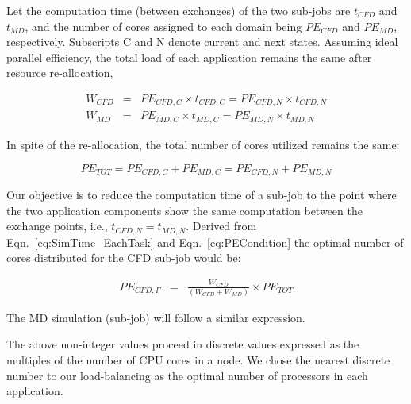 \documentclass[preprint,12pt]{elsarticle}
\begin{document}
Let the computation time (between exchanges) of the two sub-jobs are $t_{CFD}$ and $t_{MD}$, and the number of cores assigned to each domain being $PE_{CFD}$ and $PE_{MD}$, respectively. Subscripts C and N denote current and next states. Assuming ideal parallel efficiency, the total load of each application remains the same after resource re-allocation,

\vspace{-.2em}
\footnotesize
\begin{eqnarray}
W_{CFD}&=&PE_{CFD,C}\times t_{CFD,C}=PE_{CFD,N}\times t_{CFD,N} \nonumber \\
W_{MD}&=&PE_{MD,C}\times t_{MD,C}=PE_{MD,N}\times t_{MD,N}
\label{eq:SimTime_EachTask}
\end{eqnarray}
\normalsize

In spite of the re-allocation, the total number of cores utilized remains the same:

\vspace{-.2em}
\footnotesize
\begin{equation}
PE_{TOT}=PE_{CFD,C}+PE_{MD,C}=PE_{CFD,N}+PE_{MD,N}
\label{eq:PECondition}
\end{equation}
\normalsize

Our objective is to reduce the computation time of a sub-job to the point where the two application components show the same computation between the exchange points, i.e., $t_{CFD,N} = t_{MD,N}$. Derived from Eqn.~\ref{eq:SimTime_EachTask} and Eqn.~\ref{eq:PECondition} the optimal number of cores distributed for the CFD sub-job would be:

\vspace{-.2em}
\footnotesize
\begin{eqnarray}
PE_{CFD,F} & = & \frac {W_{CFD}} {(W_{CFD} + W_{MD})} \times PE_{TOT}
\end{eqnarray}
\normalsize

The MD simulation (sub-job) will follow a similar expression.

The above non-integer values proceed in discrete values expressed as the multiples of the number of CPU cores in a node. We chose the nearest discrete number to our load-balancing as the optimal number of processors in each application.
\end{document}
